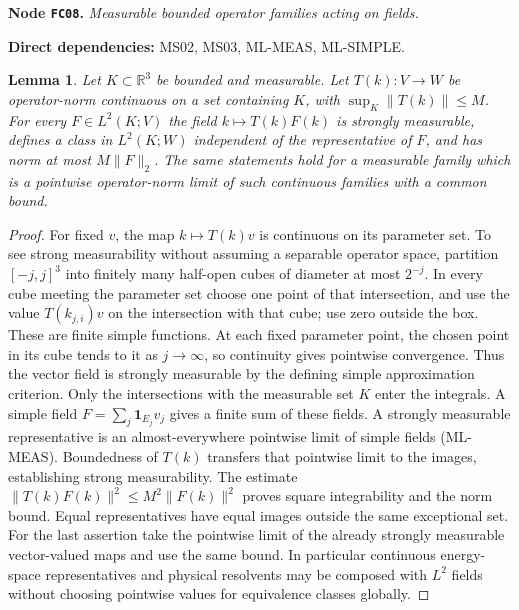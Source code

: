 \documentclass[11pt,a4paper]{article}
\newtheorem{lemma}[theorem]{Lemma}
\theoremstyle{remark}\newtheorem{remark}[theorem]{Remark}
\newcommand{\R}{\mathbb R}\newcommand{\C}{\mathbb C}\newcommand{\N}{\mathbb N}
\newcommand{\node}[3]{\par\Needspace{6\baselineskip}\smallskip\hypertarget{node:#1}{}\label{nodepage:#1}\noindent\textbf{Node \texttt{#1}.} \textit{#2.}\par\noindent\textbf{Direct dependencies:} #3.\par}
\begin{document}
\node{FC08}{Measurable bounded operator families acting on fields}{MS02, MS03, ML-MEAS, ML-SIMPLE}
\begin{lemma}\label{lem:operatorfield}
Let $K\subset\R^3$ be bounded and measurable. Let $T(k):V\to W$ be operator-norm continuous on a set containing $K$, with $\sup_K\|T(k)\|\leq M$. For every $F\in L^2(K;V)$ the field $k\mapsto T(k)F(k)$ is strongly measurable, defines a class in $L^2(K;W)$ independent of the representative of $F$, and has norm at most $M\|F\|_2$. The same statements hold for a measurable family which is a pointwise operator-norm limit of such continuous families with a common bound.
\end{lemma}
\begin{proof}
For fixed $v$, the map $k\mapsto T(k)v$ is continuous on its parameter set. To see strong measurability without assuming a separable operator space, partition $[-j,j]^3$ into finitely many half-open cubes of diameter at most $2^{-j}$. In every cube meeting the parameter set choose one point of that intersection, and use the value $T(k_{j,i})v$ on the intersection with that cube; use zero outside the box. These are finite simple functions. At each fixed parameter point, the chosen point in its cube tends to it as $j\to\infty$, so continuity gives pointwise convergence. Thus the vector field is strongly measurable by the defining simple approximation criterion. Only the intersections with the measurable set $K$ enter the integrals. A simple field $F=\sum_j\mathbf1_{E_j}v_j$ gives a finite sum of these fields. A strongly measurable representative is an almost-everywhere pointwise limit of simple fields (ML-MEAS). Boundedness of $T(k)$ transfers that pointwise limit to the images, establishing strong measurability. The estimate $\|T(k)F(k)\|^2\leq M^2\|F(k)\|^2$ proves square integrability and the norm bound. Equal representatives have equal images outside the same exceptional set. For the last assertion take the pointwise limit of the already strongly measurable vector-valued maps and use the same bound. In particular continuous energy-space representatives and physical resolvents may be composed with $L^2$ fields without choosing pointwise values for equivalence classes globally.
\end{proof}
\end{document}
